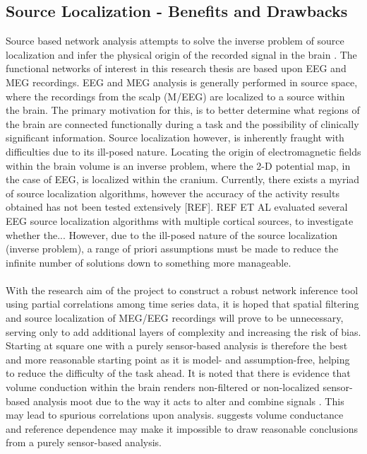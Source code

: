 \documentclass[11pt]{article}
\begin{document}
\subsection{Source Localization - Benefits and Drawbacks}
Source based network analysis attempts to solve the inverse problem of source localization and infer the physical origin of the recorded signal in the brain \citep{revbull}. The functional networks of interest in this research thesis are based upon EEG and MEG recordings. EEG and MEG analysis is generally performed in source space, where the recordings from the scalp (M/EEG) are localized to a source within the brain. The primary motivation for this, is to better determine what regions of the brain are connected functionally during a task and the possibility of clinically significant information. Source localization however, is inherently fraught with difficulties due to its ill-posed nature. Locating the origin of electromagnetic fields within the brain volume is an inverse problem, where the 2-D potential map, in the case of EEG, is localized within the cranium. Currently, there exists a myriad of source localization algorithms, however the accuracy of the activity results obtained has not been tested extensively [REF].  REF ET AL evaluated several EEG source localization algorithms with multiple cortical sources, to investigate whether the...  However, due to the ill-posed nature of the source localization (inverse problem), a range of priori assumptions must be made to reduce the infinite number of solutions down to something more manageable.\\
\\
With the research aim of the project to construct a robust network inference tool using partial correlations among time series data, it is hoped that spatial filtering and source localization of MEG/EEG recordings will prove to be unnecessary, serving only to add additional layers of complexity and increasing the risk of bias. Starting at square one with a purely sensor-based analysis is therefore the best and more reasonable starting point as it is model- and assumption-free, helping to reduce the difficulty of the task ahead. It is noted that there is evidence that volume conduction within the brain renders non-filtered or non-localized sensor-based analysis moot due to the way it acts to alter and combine signals \citep{sens2}. This may lead to spurious correlations upon analysis. \citet{sens1} suggests volume conductance and reference dependence may make it impossible to draw reasonable conclusions from a purely sensor-based analysis.\\
\end{document}
